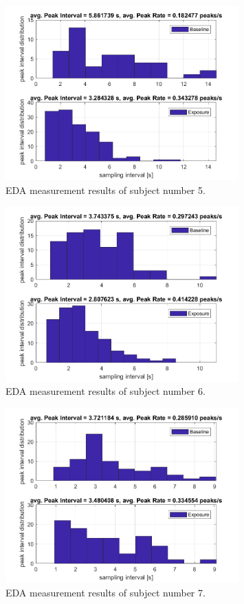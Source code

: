 \begin{figure}[H]
\centering
\includegraphics[width=0.8\textwidth]{images/5EDA.png}
\caption{EDA measurement results of subject number 5.}
\label{EDAtabImg}
\end{figure}

\begin{figure}[H]
\centering
\includegraphics[width=0.8\textwidth]{images/6EDA.png}
\caption{EDA measurement results of subject number 6.}
\label{EDAtabImg}
\end{figure}

\begin{figure}[H]
\centering
\includegraphics[width=0.8\textwidth]{images/7EDA.png}
\caption{EDA measurement results of subject number 7.}
\label{EDAtabImg}
\end{figure}


